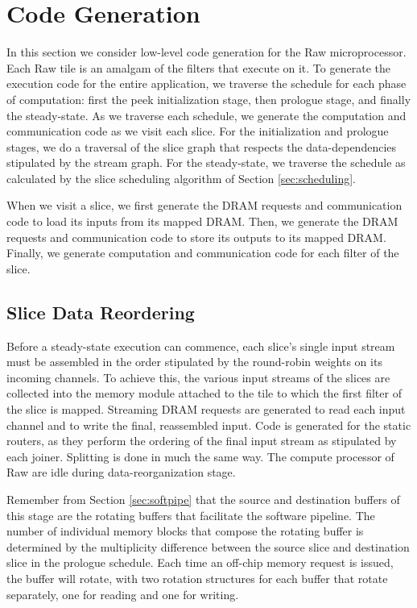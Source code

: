 \section{Code Generation}
\label{sec:codegen}
In this section we consider low-level code generation for the Raw
microprocessor. Each Raw tile is an amalgam of the filters that
execute on it. To generate the execution code for the entire
application, we traverse the schedule for each phase of computation:
first the peek initialization stage, then prologue stage, and finally
the steady-state.  As we traverse each schedule, we generate the
computation and communication code as we visit each slice.  For the
initialization and prologue stages, we do a traversal of the slice
graph that respects the data-dependencies stipulated by the stream
graph. For the steady-state, we traverse the schedule as calculated by
the slice scheduling algorithm of Section \ref{sec:scheduling}.

When we visit a slice, we first generate the DRAM requests and
communication code to load its inputs from its mapped DRAM. Then, we
generate the DRAM requests and communication code to store its outputs
to its mapped DRAM.  Finally, we generate computation and
communication code for each filter of the slice.

\subsection{Slice Data Reordering}
Before a steady-state execution can commence, each slice's single
input stream must be assembled in the order stipulated by the
round-robin weights on its incoming channels. To achieve this, the
various input streams of the slices are collected into the memory
module attached to the tile to which the first filter of the slice is
mapped. Streaming DRAM requests are generated to read each input
channel and to write the final, reassembled input.  Code is generated
for the static routers, as they perform the ordering of the final
input stream as stipulated by each joiner.  Splitting is done in much
the same way.  The compute processor of Raw are idle during
data-reorganization stage.

Remember from Section \ref{sec:softpipe} that the source and
destination buffers of this stage are the rotating buffers that
facilitate the software pipeline.  The number of individual memory
blocks that compose the rotating buffer is determined by the
multiplicity difference between the source slice and destination slice
in the prologue schedule.  Each time an off-chip memory request is
issued, the buffer will rotate, with two rotation structures for each
buffer that rotate separately, one for reading and one for writing.

